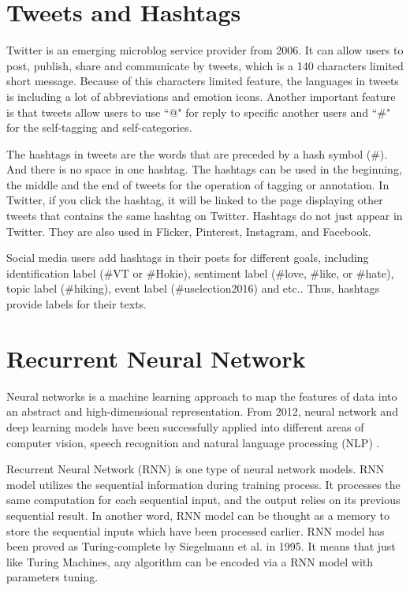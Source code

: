 


\section{Tweets and Hashtags}

Twitter is an emerging microblog service provider from 2006. It can allow users to post, publish, share and communicate by tweets, which is a 140 characters limited short message. Because of this characters limited feature, the languages in tweets is including a lot of abbreviations and emotion icons. Another important feature is that tweets allow users to use ``@" for reply to specific another users and ``\#" for the self-tagging and self-categories. 

The hashtags in tweets are the words that are preceded by a hash symbol (\#). And there is no space in one hashtag. The hashtags can be used in the beginning, the middle and the end of tweets for the operation of tagging or annotation. In Twitter, if you click the hashtag, it will be linked to the page displaying other tweets that contains the same hashtag on Twitter. Hashtags do not just appear in Twitter. They are also used in Flicker, Pinterest, Instagram, and Facebook. 

Social media users add hashtags in their posts for different goals, including identification label (\#VT or \#Hokie), sentiment label (\#love, \#like, or \#hate), topic label (\#hiking), event label (\#uselection2016) and etc.. Thus, hashtags provide labels for their texts.

\section{Recurrent Neural Network}
Neural networks is a machine learning approach to map the features of data into an abstract and high-dimensional representation. From 2012, neural network and deep learning models have been successfully applied into different areas of computer vision, speech recognition and natural language processing (NLP) \cite{LeCun2015}. 

Recurrent Neural Network (RNN) is one type of neural network models. RNN model utilizes the sequential information during training process. It processes the same computation for each sequential input, and the output relies on its previous sequential result. In another word, RNN model can be thought as a memory to store the sequential inputs which have been processed earlier.  RNN model has been proved as Turing-complete by Siegelmann et al.\cite{Siegelmann1995} in 1995. It means that just like Turing Machines, any algorithm can be encoded via a RNN model with parameters tuning. 

